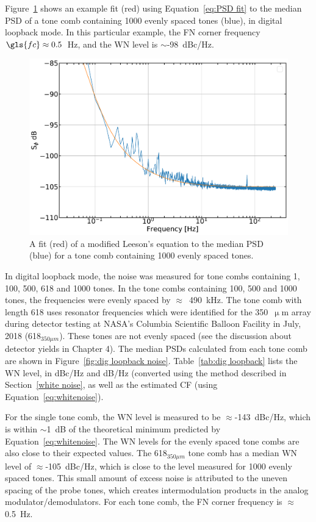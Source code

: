 Figure~\ref{fig:psd 1000 fit} shows an example fit (red) using Equation~\ref{eq:PSD fit} to the median PSD of a tone comb containing 1000 evenly spaced tones (blue), in digital loopback mode. In this particular example, the FN corner frequency $\gls{fc} \approx 0.5$~Hz, and the WN level is $\sim$-98~dBc/Hz.

\begin{figure}[!htbp]
\centering
\includegraphics[width=\textwidth]{figures/readout/sim/c1000_PSD_fit}
\caption[~A fit of a modified Leeson's equation to the median PSD for a tone comb containing 1000 evenly spaced tones.]{A fit (red) of a modified Leeson's equation to the median PSD (blue) for a tone comb containing 1000 evenly spaced tones.}
\label{fig:psd 1000 fit}
\end{figure}

In digital loopback mode, the noise was measured for tone combs containing 1, 100, 500, 618 and 1000 tones. In the tone combs containing 100, 500 and 1000 tones, the frequencies were evenly spaced by $\approx$~490~kHz. The tone comb with length 618 uses resonator frequencies which were identified for the 350~$\upmu$m array during detector testing at NASA's Columbia Scientific Balloon Facility in July, 2018 (618$_{350\mu m}$). These tones are not evenly spaced (see the discussion about detector yields in Chapter 4). The median PSDs calculated from each tone comb are shown in Figure~\ref{fig:dig loopback noise}. Table~\ref{tab:dig loopback} lists the WN level, in dBc/Hz and dB/Hz (converted using the method described in Section~\ref{white noise}, as well as the estimated CF (using Equation~\ref{eq:whitenoise}).

For the single tone comb, the WN level is measured to be $\approx$-143~dBc/Hz, which is within $\sim$1~dB of the theoretical minimum predicted by Equation~\ref{eq:whitenoise}. The WN levels for the evenly spaced tone combs are also close to their expected values. The 618$_{350\mu m}$ tone comb has a median WN level of $\approx$-105~dBc/Hz, which is close to the level measured for 1000 evenly spaced tones. This small amount of excess noise is attributed to the uneven spacing of the probe tones, which creates intermodulation products in the analog modulator/demodulators. For each tone comb, the FN corner frequency is $\approx$0.5~Hz.

